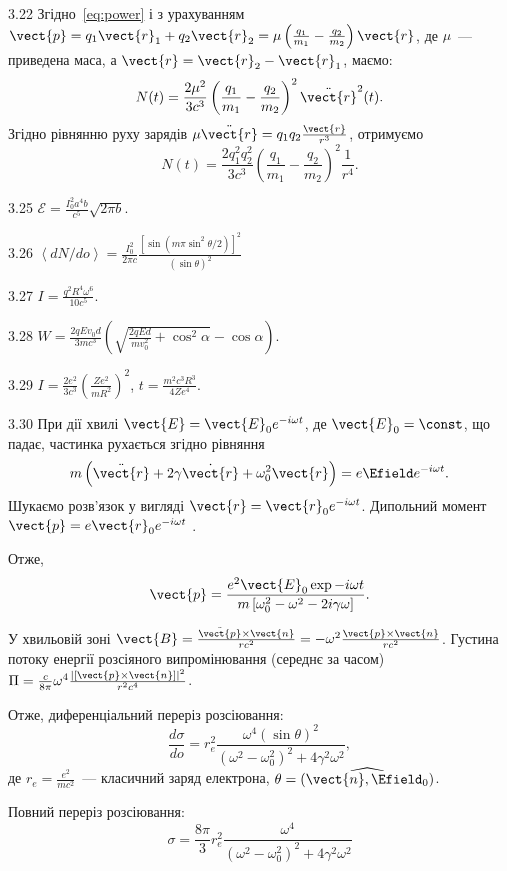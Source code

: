 \begin{Solution}{3.{22}}
	Згідно~\eqref{eq:power} і з урахуванням $\vect{p} = q_1\vect{r}_1 + q_2\vect{r}_2 = \mu\left( \frac{q_1}{m_1}  - \frac{q_2}{m_2}\right)\vect{r} $, де $\mu$~--- приведена маса, а $\vect{r} = \vect{r}_2 - \vect{r}_1$, маємо:
	\[
		N(t) = \frac{2\mu^2}{3c^3}\left( \frac{q_1}{m_1}  - \frac{q_2}{m_2}\right)^2\ddot{\vect{r}}^2(t).
	\]
	Згідно рівнянню руху зарядів $\mu\ddot{\vect{r}} = {q_1q_2}\frac{\vect{r}}{r^3}$, отримуємо
	\[
		N(t) = \frac{2q_1^2q_2^2}{3c^3} \left( \frac{q_1}{m_1} - \frac{q_2}{m_2}\right)^2 \frac{1}{r^4}.
	\]
\end{Solution}
\begin{Solution}{3.{25}}
	$\mathcal{E} = \frac{I_0^2a^4b}{c^5}\sqrt{2\pi b}$.
\end{Solution}
\begin{Solution}{3.{26}}
	$\left\langle {dN/do} \right\rangle  = \frac{I_0^2}{2\pi c}\frac{\left[\sin(m\pi \sin^2\theta/2) \right]^2}{(\sin\theta)^2}$
\end{Solution}
\begin{Solution}{3.{27}}
	$I = \frac{q^2R^4\omega^6}{10c^5} $.
\end{Solution}
\begin{Solution}{3.{28}}
	$W = \frac{2qEv_0d}{3mc^3}\left( \sqrt{\frac{2qEd}{mv_0^2}+\cos^2\alpha} - \cos\alpha\right) $.
\end{Solution}
\begin{Solution}{3.{29}}
	$I = \frac{2e^2}{3c^3} \left( \frac{Ze^2}{mR^2}\right)^2 $, $t = \frac{m^2c^3R^3}{4Ze^4}$.
\end{Solution}
\begin{Solution}{3.{30}}
	При дії хвилі $\vect{E} = \vect{E}_0e^{-i\omega t}$, де $\vect{E}_0 = \const$, що падає, частинка рухається згідно рівняння
	\[
		m \left( \ddot{\vect{r}} + 2\gamma\dot{\vect{r}} + \omega_0^2\vect{r}\right) = e\Efield e^{-i\omega t}.
	\]
	Шукаємо розв’язок у вигляді $\vect{r}  = \vect{r}_0e^{-i\omega t}$. Дипольний момент $\vect{p}  = e\vect{r}_0e^{-i\omega t}$ .

	Отже,
	\[
		\vect{p} = \frac{e^2\vect{E}_0\exp{- i\omega t}}{m\left[ {\omega _0^2 - \omega ^2 - 2i\gamma \omega } \right]}.
	\]

	У хвильовій зоні $\vect{B} = \frac{\ddot{\vect{p}} \times \vect{n}}{rc^2} =  - \omega^2 \frac{\vect{p} \times \vect{n}}{rc^2}$.
	Густина потоку енергії розсіяного випромінювання (середнє за часом) $\Pi  = \frac{c}{8\pi}{\omega ^4}\frac{{\left| {\left[ {{\vect{p}} \times {\vect{n}}} \right]} \right|}^2}{{{r^2}{c^4}}}$.

	Отже, диференціальний переріз розсіювання:
	\[\frac{{d\sigma }}{{do}} = r_e^2\frac{{{\omega ^4}{{(\sin \theta )}^2}}}{{{{({\omega ^2} - \omega _0^2)}^2} + 4{\gamma ^2}{\omega ^2}}},
	\]
	де $r_e = \frac{e^2}{mc^2}$~--- класичний заряд електрона, $\theta  = (\widehat{\vect{n},\Efield_0})$.

	Повний переріз розсіювання:
	\[
		\sigma  = \frac{{8\pi }}{3}r_e^2\frac{{{\omega ^4}}}{{{{({\omega ^2} - \omega _0^2)}^2} + 4{\gamma ^2}{\omega ^2}}}
	\]
\end{Solution}
